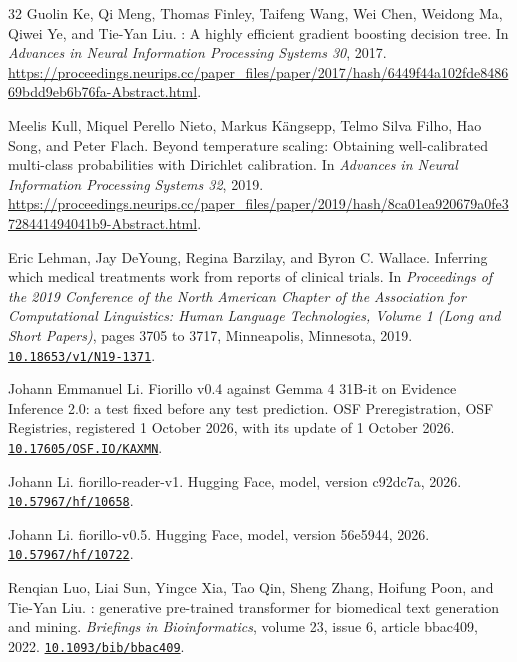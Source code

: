 \documentclass[11pt,letterpaper]{article}
\newcommand{\doi}[1]{\href{https://doi.org/#1}{\nolinkurl{#1}}}
\begin{document}
\begin{thebibliography}{32}
Guolin Ke, Qi Meng, Thomas Finley, Taifeng Wang, Wei Chen, Weidong Ma, Qiwei Ye, and Tie-Yan Liu.
: A highly efficient gradient boosting decision tree.
\newblock In \emph{Advances in Neural Information Processing Systems 30}, 2017.
\newblock \url{https://proceedings.neurips.cc/paper_files/paper/2017/hash/6449f44a102fde848669bdd9eb6b76fa-Abstract.html}.

Meelis Kull, Miquel Perello Nieto, Markus K{\"a}ngsepp, Telmo Silva Filho, Hao Song, and Peter Flach.
\newblock Beyond temperature scaling: Obtaining well-calibrated multi-class probabilities with {Dirichlet} calibration.
\newblock In \emph{Advances in Neural Information Processing Systems 32}, 2019.
\newblock \url{https://proceedings.neurips.cc/paper_files/paper/2019/hash/8ca01ea920679a0fe3728441494041b9-Abstract.html}.

Eric Lehman, Jay DeYoung, Regina Barzilay, and Byron C. Wallace.
\newblock Inferring which medical treatments work from reports of clinical trials.
\newblock In \emph{Proceedings of the 2019 Conference of the North American Chapter of the Association for Computational Linguistics: Human Language Technologies, Volume 1 (Long and Short Papers)}, pages 3705 to 3717, Minneapolis, Minnesota, 2019.
\newblock \doi{10.18653/v1/N19-1371}.

Johann Emmanuel Li.
\newblock Fiorillo v0.4 against Gemma 4 31B-it on Evidence Inference 2.0: a test fixed before any test prediction.
\newblock OSF Preregistration, OSF Registries, registered 1 October 2026, with its update of 1 October 2026.
\newblock \doi{10.17605/OSF.IO/KAXMN}.

Johann Li.
\newblock fiorillo-reader-v1.
\newblock Hugging Face, model, version c92dc7a, 2026.
\newblock \doi{10.57967/hf/10658}.

Johann Li.
\newblock fiorillo-v0.5.
\newblock Hugging Face, model, version 56e5944, 2026.
\newblock \doi{10.57967/hf/10722}.

Renqian Luo, Liai Sun, Yingce Xia, Tao Qin, Sheng Zhang, Hoifung Poon, and Tie-Yan Liu.
: generative pre-trained transformer for biomedical text generation and mining.
\newblock \emph{Briefings in Bioinformatics}, volume 23, issue 6, article bbac409, 2022.
\newblock \doi{10.1093/bib/bbac409}.


\end{thebibliography}
\end{document}
